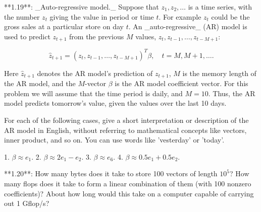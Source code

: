 

**1.19**: _Auto-regressive model._ Suppose that \(z_{1},z_{2},\ldots\) is a time series, with the number \(z_{t}\) giving the value in period or time \(t\). For example \(z_{t}\) could be the gross sales at a particular store on day \(t\). An _auto-regressive_ (AR) model is used to predict \(z_{t+1}\) from the previous \(M\) values, \(z_{t},z_{t-1},\ldots,z_{t-M+1}\):

\[\hat{z}_{t+1}=(z_{t},z_{t-1},\ldots,z_{t-M+1})^{T}\beta,\quad t=M,M+1,\ldots.\]

Here \(\hat{z}_{t+1}\) denotes the AR model's prediction of \(z_{t+1}\), \(M\) is the memory length of the AR model, and the \(M\)-vector \(\beta\) is the AR model coefficient vector. For this problem we will assume that the time period is daily, and \(M=10\). Thus, the AR model predicts tomorrow's value, given the values over the last 10 days.

For each of the following cases, give a short interpretation or description of the AR model in English, without referring to mathematical concepts like vectors, inner product, and so on. You can use words like 'vesterday' or 'today'.

1. \(\beta\approx e_{1}\).
2. \(\beta\approx 2e_{1}-e_{2}\).
3. \(\beta\approx e_{6}\).
4. \(\beta\approx 0.5e_{1}+0.5e_{2}\).

**1.20**: How many bytes does it take to store 100 vectors of length \(10^{5}\)? How many flops does it take to form a linear combination of them (with 100 nonzero coefficients)? About how long would this take on a computer capable of carrying out 1 Gflop/s?